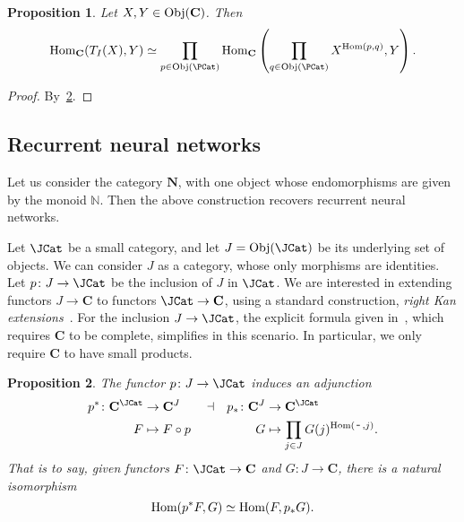 \documentclass[12pt]{article}
\newtheorem{proposition}{Proposition}
\newcommand{\Hom}{{\textnormal{Hom}}}
\newcommand{\Obj}{{\textnormal{Obj}}}
\newcommand{\Cat}{{\mathbf{C}}}
\newcommand{\anon}{{\,\mbox{-}\,}}
\begin{document}
    \begin{proposition}\label{prop:morphisms}
        Let $X, Y \in \Obj(\Cat)$. Then         
        \begin{equation*}
            \Hom_\Cat(T_I(X), Y) \simeq
            \prod_{p\in \Obj(\PCat)}
            \Hom_\Cat\left(\prod_{q \in \Obj(\PCat)} X^{\Hom(p, q)}, Y\right).
        \end{equation*}
    \end{proposition}
    \begin{proof}
        By~\cref{prop:adjunction}.
    \end{proof}

    \subsection{Recurrent neural networks}

    Let us consider the category $\mathbf N$, with one object whose endomorphisms are given by the monoid $\mathbb N$. Then the above construction recovers recurrent neural networks.


    Let $\JCat$ be a small category, and let $J = \Obj(\JCat)$ be its underlying set of objects. We can consider $J$ as a category, whose only morphisms are identities. Let $p \colon J \rightarrow \JCat$ be the inclusion of $J$ in $\JCat$. We are interested in extending functors $J \rightarrow \Cat$ to functors $\JCat \rightarrow \Cat$, using a standard construction, {\em right Kan extensions}~\cite[Chapt.~X]{mac2013categories}. For the inclusion $J \rightarrow \JCat$, the explicit formula given in~\cite[Sect.~3.7]{borceux1994handbook}, which requires $\Cat$ to be complete, simplifies in this scenario. In particular, we only require $\Cat$ to have small products. 

\begin{proposition}\label{prop:adjunction}
    The functor $p \colon J \rightarrow \JCat$ induces an adjunction
    \begin{align*}
        p^*\colon \Cat^\JCat & \rightarrow \Cat^J
                             &
                             & \dashv
                             &
        p_*\colon \Cat^J     & \rightarrow \Cat^\JCat                         \\
        F                    & \mapsto F\circ p
                             &
                             &
                             &
        G                    & \mapsto \prod_{j \in J} G(j)^{\Hom(\anon, j)}.
    \end{align*}
    That is to say, given functors $F\colon \JCat \rightarrow \Cat$ and $G \colon J \rightarrow \Cat$, there is a natural isomorphism
    \begin{equation*}
        \Hom(p^*F, G) \simeq \Hom(F, p_*G).
    \end{equation*}
\end{proposition}
\end{document}
